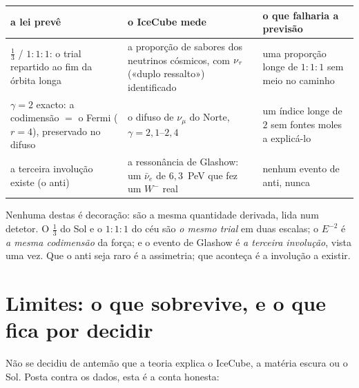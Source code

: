 \documentclass[11pt,a4paper]{article}
\begin{document}
\begin{center}\small
\begin{tabular}{@{}p{4.7cm}p{4.7cm}p{4.7cm}@{}}
\toprule
a lei prevê & o IceCube mede & o que falharia a previsão \\
\midrule
$\tfrac13$ / $1{:}1{:}1$: o trial repartido ao fim da órbita longa &
a proporção de sabores dos neutrinos cósmicos, com $\nu_\tau$ («duplo ressalto») identificado &
uma proporção longe de $1{:}1{:}1$ sem meio no caminho \\
$\gamma=2$ exacto: a codimensão $=$ o Fermi ($r{=}4$), preservado no difuso &
o difuso de $\nu_\mu$ do Norte, $\gamma=2{,}1$--$2{,}4$ &
um índice longe de $2$ sem fontes moles a explicá-lo \\
a terceira involução existe (o anti) &
a ressonância de Glashow: um $\bar\nu_e$ de $6{,}3$~PeV que fez um $W^-$ real &
nenhum evento de anti, nunca \\
\bottomrule
\end{tabular}
\end{center}

\noindent Nenhuma destas é decoração: são a mesma quantidade derivada, lida num detetor. O $\tfrac13$ do
Sol e o $1{:}1{:}1$ do céu são \emph{o mesmo trial} em duas escalas; o $E^{-2}$ é \emph{a mesma codimensão}
da força; e o evento de Glashow é \emph{a terceira involução}, vista uma vez. Que o anti seja raro é a
assimetria; que aconteça é a involução a existir.

\section{Limites: o que sobrevive, e o que fica por decidir}\label{sec:limites}

Não se decidiu de antemão que a teoria explica o IceCube, a matéria escura ou o Sol. Posta contra os dados,
esta é a conta honesta:
\end{document}
